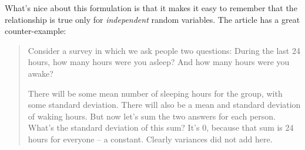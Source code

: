 \documentclass[11pt, oneside]{article}   	%
\begin{document}
What's nice about this formulation is that it makes it easy to remember that the relationship is true only for \emph{independent} random variables.  The article has a great counter-example:

\begin{quote}\color{blue}Consider a survey in which we ask people two questions: During the last 24 hours, how many hours were you asleep? And how many hours were you awake?

There will be some mean number of sleeping hours for the group, with some standard deviation. There will also be a mean and standard deviation of waking hours. But now let's sum the two answers for each person. What's the standard deviation of this sum? It's 0, because that sum is 24 hours for everyone -- a constant. Clearly variances did not add here.\color{black}\end{quote}
\end{document}

